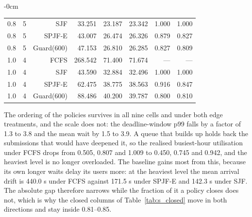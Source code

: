 \documentclass[mathematics,supfile,submit,moreauthors]{Definitions/mdpi}
\newcommand{\devnum}[1]{#1}
\begin{document}
\begin{table}[htbp]
\begin{adjustwidth}{-\extralength}{0cm}
\begin{tabular}{llrrrrrr}
\devnum{0.8} & \devnum{5} & SJF & \devnum{33.251} & \devnum{23.187} & \devnum{23.342} & \devnum{1.000} & \devnum{1.000} \\
\devnum{0.8} & \devnum{5} & SPJF-E & \devnum{43.007} & \devnum{26.474} & \devnum{26.326} & \devnum{0.879} & \devnum{0.827} \\
\devnum{0.8} & \devnum{5} & Guard(\devnum{600}) & \devnum{47.153} & \devnum{26.810} & \devnum{26.285} & \devnum{0.827} & \devnum{0.809} \\
\midrule
\devnum{1.0} & \devnum{4} & FCFS & \devnum{268.542} & \devnum{71.400} & \devnum{71.674} & --- & --- \\
\devnum{1.0} & \devnum{4} & SJF & \devnum{43.590} & \devnum{32.884} & \devnum{32.496} & \devnum{1.000} & \devnum{1.000} \\
\devnum{1.0} & \devnum{4} & SPJF-E & \devnum{62.475} & \devnum{38.775} & \devnum{38.563} & \devnum{0.916} & \devnum{0.847} \\
\devnum{1.0} & \devnum{4} & Guard(\devnum{600}) & \devnum{88.486} & \devnum{40.200} & \devnum{39.787} & \devnum{0.800} & \devnum{0.810} \\
\bottomrule
\end{tabular}
\end{adjustwidth}
\end{table}

The ordering of the policies survives in all nine cells and under both edge treatments,
and the scale does not: the deadline-window p99 falls by a factor of \devnum{1.3} to
\devnum{3.8} and the mean wait by \devnum{1.5} to \devnum{3.9}. A
queue that builds up holds back the submissions that would have deepened it, so the
realised busiest-hour utilisation under FCFS drops from \devnum{0.505}, \devnum{0.807}
and \devnum{1.009} to \devnum{0.450}, \devnum{0.745} and \devnum{0.942}, and the heaviest
level is no longer overloaded. The baseline gains most from this, because its own longer
waits delay its users more: at the heaviest level the mean arrival drift is
\devnum{440.0} s under FCFS against \devnum{171.5} s under SPJF-E and \devnum{142.3} s
under SJF. The absolute gap therefore narrows while the fraction of it a policy closes
does not, which is why the closed columns of Table~\ref{tab:s_closed} move in both
directions and stay inside \devnum{0.81}--\devnum{0.85}.
\end{document}
